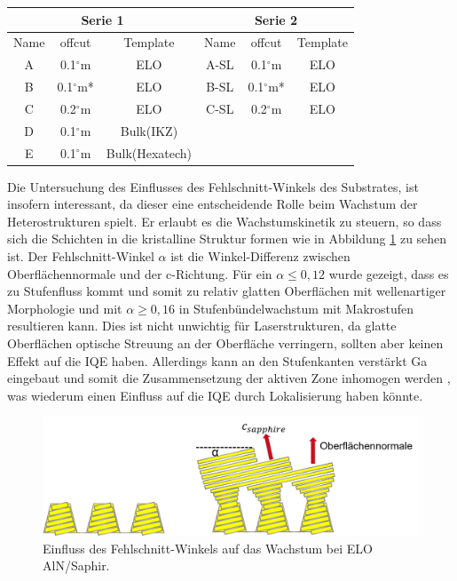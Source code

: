 \vspace{1cm}
\setlength{\arrayrulewidth}{0.05mm}
\setlength{\tabcolsep}{2.5mm}
\renewcommand{\arraystretch}{1}
\centering
\begin{tabular}{ |c|c|c|c|c|c|   }
\hline
\multicolumn{3}{|c|}{Serie 1} & \multicolumn{3}{c|}{Serie 2}  \\
\hline
Name & offcut& Template & Name& offcut & Template \\
\hline
A & 0.1$^\circ$m & ELO & A-SL & 0.1$^\circ$m & ELO \\
B & 0.1$^\circ$m* & ELO & B-SL & 0.1$^\circ$m* & ELO \\
C & 0.2$^\circ$m & ELO & C-SL & 0.2$^\circ$m & ELO \\
D & 0.1$^\circ$m & Bulk(IKZ) &  & &  \\
E & 0.1$^\circ$m & Bulk(Hexatech) & & & \\
\hline
\end{tabular}
\vspace{1cm}
\raggedright
\newline
Die Untersuchung des Einflusses des Fehlschnitt-Winkels des Substrates, ist insofern interessant, da dieser eine entscheidende Rolle beim Wachstum der Heterostrukturen spielt. Er erlaubt es die Wachstumskinetik zu steuern, so dass sich die Schichten in die kristalline Struktur  formen wie in Abbildung \ref{fig:offcut} zu sehen ist.
Der Fehlschnitt-Winkel $\alpha$ ist die Winkel-Differenz zwischen Oberflächennormale und der c-Richtung. Für ein $\alpha \leq 0,12 $ wurde gezeigt, dass es zu Stufenfluss kommt und somit zu relativ glatten Oberflächen mit wellenartiger Morphologie und mit $\alpha \geq 0,16 $ in Stufenbündelwachstum mit Makrostufen resultieren kann. Dies ist nicht unwichtig für Laserstrukturen, da glatte Oberflächen optische Streuung an der Oberfläche verringern, sollten aber keinen Effekt auf die IQE haben. Allerdings kann an den Stufenkanten verstärkt Ga eingebaut und somit die Zusammensetzung der aktiven Zone inhomogen werden \cite{zeimeru} \cite{MOGILATENKO2014222} \cite{fmehnke}, was wiederum einen Einfluss auf die IQE durch Lokalisierung haben könnte.
%
\begin{figure}[htb]
\includegraphics[width=\linewidth]{Bilder/offcut.png}
\caption{Einfluss des Fehlschnitt-Winkels auf das Wachstum bei ELO AlN/Saphir.}
\label{fig:offcut}
\end{figure}

